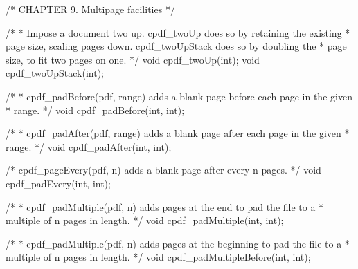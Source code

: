 /* CHAPTER 9. Multipage facilities */

/*
 * Impose a document two up. cpdf_twoUp does so by retaining the existing
 * page size, scaling pages down. cpdf_twoUpStack does so by doubling the
 * page size, to fit two pages on one.
 */
void cpdf_twoUp(int);
void cpdf_twoUpStack(int);

/*
 * cpdf_padBefore(pdf, range) adds a blank page before each page in the given
 * range.
 */
void cpdf_padBefore(int, int);

/*
 * cpdf_padAfter(pdf, range) adds a blank page after each page in the given
 * range.
 */
void cpdf_padAfter(int, int);

/* cpdf_pageEvery(pdf, n) adds a blank page after every n pages. */
void cpdf_padEvery(int, int);

/*
 * cpdf_padMultiple(pdf, n) adds pages at the end to pad the file to a
 * multiple of n pages in length.
 */
void cpdf_padMultiple(int, int);

/*
 * cpdf_padMultiple(pdf, n) adds pages at the beginning to pad the file to a
 * multiple of n pages in length.
 */
void cpdf_padMultipleBefore(int, int);

